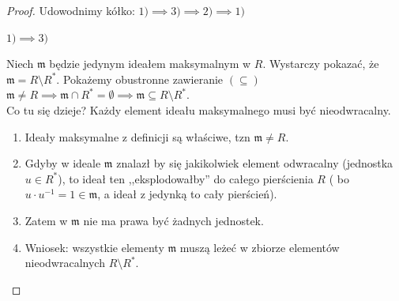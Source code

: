 \begin{proof}
	Udowodnimy kółko: $1) \implies 3) \implies 2) \implies 1)$

	\noindent $1) \implies 3)$ 

	Niech $\mathfrak{m}$ będzie jedynym ideałem maksymalnym w $R$. Wystarczy pokazać, że  $\mathfrak{m} = R\setminus R^{\ast} $. Pokażemy obustronne zawieranie
	$\left( \subseteq  \right) $ \\
	$\mathfrak{m} \neq R \implies \mathfrak{m} \cap R^{\ast}  = \emptyset \implies \mathfrak{m} \subseteq R\setminus R^{\ast}$. \\
	Co tu się dzieje? Każdy element ideału maksymalnego musi być nieodwracalny.
	\begin{enumerate}[label=\arabic*)]
		\item Ideały maksymalne z definicji są właściwe, tzn $\mathfrak{m} \neq R$.
		\item Gdyby w ideale $\mathfrak{m}$ znalazł by się jakikolwiek element odwracalny (jednostka $u \in R^{\ast} $), to ideał ten ,,eksplodowałby'' do całego pierścienia $R$ ( bo  $u\cdot u^{-1} = 1 \in \mathfrak{m}$, a ideał z jedynką to cały pierścień).
		\item Zatem w $\mathfrak{m}$ nie ma prawa być żadnych jednostek.
		\item Wniosek: wszystkie elementy $\mathfrak{m}$ muszą leżeć w zbiorze elementów nieodwracalnych  $R\setminus R^{\ast} $.
	\end{enumerate}


\end{proof}
